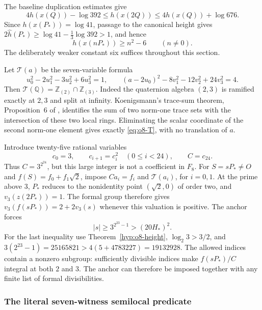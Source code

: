 \documentclass[11pt]{article}
\theoremstyle{definition}
\theoremstyle{remark}
\newcommand{\Q}{\mathbb Q}
\newcommand{\Z}{\mathbb Z}
\begin{document}
The baseline duplication estimates give
\[
 4h(x(Q))-\log392\le h(x(2Q))
       \le4h(x(Q))+\log676.
\]
Since $h(x(P_*))=\log41$, passage to the canonical height gives
$2\widehat h(P_*)\ge\log41-\frac13\log392>1$, and hence
\begin{equation}\label{eq:o8-indexheight}
 h(x(nP_*))\ge n^2-6\qquad(n\ne0).
\end{equation}
The deliberately weaker constant six suffices throughout this section.

Let $\mathcal T(a)$ be the seven-variable formula
\begin{equation}\label{eq:o8-T}
 u_0^2-2u_1^2-3u_2^2+6u_3^2=1,\qquad
 (a-2u_0)^2-8v_1^2-12v_2^2+24v_3^2=4.
\end{equation}
Then $\mathcal T(\Q)=\Z_{(2)}\cap\Z_{(3)}$. Indeed the quaternion
algebra $(2,3)$ is ramified exactly at $2,3$ and split at infinity.
Koenigsmann's trace-sum theorem, Proposition~6 of
\cite{koenigsmann-defining}, identifies the sum of two norm-one trace
sets with the intersection of these two local rings. Eliminating the
scalar coordinate of the second norm-one element gives exactly
\eqref{eq:o8-T}, with no translation of $a$.

Introduce twenty-five rational variables
\begin{equation}\label{eq:o8-chain}
 c_0=3,\qquad c_{i+1}=c_i^2\quad(0\le i<24),\qquad C=c_{24}.
\end{equation}
Thus $C=3^{2^{24}}$, but this large integer is not a coefficient in
$F_8$. For $S=sP_*\ne O$ and $f(S)=f_0+f_1\sqrt2$, impose
$Ca_i=f_i$ and $\mathcal T(a_i)$, for $i=0,1$.
At the prime above $3$, $P_*$ reduces to the nonidentity point
$(\sqrt2,0)$ of order two, and $v_3(z(2P_*))=1$.
The formal group therefore gives
$v_3(f(sP_*))=2+2v_3(s)$ whenever this valuation is positive.
The anchor forces
\begin{equation}\label{eq:o8-anchor-bound}
 |s|\ge3^{2^{23}-1}>(20H_*)^2.
\end{equation}
For the last inequality use Theorem~\ref{hyp:o8-height},
$\log_2 3>3/2$, and
$3(2^{23}-1)=25165821>4(5+4783227)=19132928$.
The allowed indices contain a nonzero subgroup: sufficiently divisible
indices make $f(sP_*)/C$ integral at both $2$ and $3$. The anchor can
therefore be imposed together with any finite list of formal divisibilities.

\subsubsection{The literal seven-witness semilocal predicate}\label{subsec:o8-anchor-proof}
\end{document}
